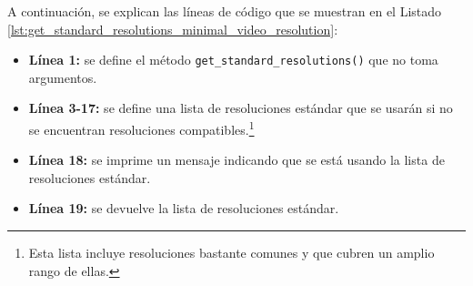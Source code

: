 A continuación, se explican las líneas de código que se muestran en el Listado \ref{lst:get_standard_resolutions_minimal_video_resolution}:
\begin{itemize}
    \item \textbf{Línea 1:} se define el método \texttt{get\_standard\_resolutions()} que no toma argumentos.
    \item \textbf{Línea 3-17:} se define una lista de resoluciones estándar que se usarán si no se encuentran resoluciones compatibles.\footnote{Esta lista incluye resoluciones bastante comunes y que cubren un amplio rango de ellas.}
    \item \textbf{Línea 18:} se imprime un mensaje indicando que se está usando la lista de resoluciones estándar.
    \item \textbf{Línea 19:} se devuelve la lista de resoluciones estándar.
\end{itemize}
\vspace{\baselineskip}

